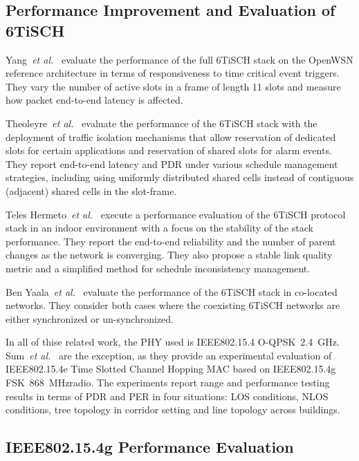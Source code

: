\documentclass[sensors,article,submit,moreauthors,pdftex]{Definitions/mdpi}
\newcommand{\fsk}           {FSK~868~MHz}
\newcommand{\oqpsk}         {O-QPSK~2.4~GHz}
\newcommand{\etal}          {\textit{et al.}}
\begin{document}
\subsection{Performance Improvement and Evaluation of 6TiSCH}
\label{sec:related_6tisch}

Yang~\etal~\cite{yang18analysis} evaluate the performance of the full 6TiSCH stack on the OpenWSN reference architecture in terms of responsiveness to time critical event triggers.
They vary the number of active slots in a frame of length 11 slots and measure how packet end-to-end latency is affected.

Theoleyre~\etal~\cite{theoleyre16experimental} evaluate the performance of the 6TiSCH stack with the deployment of traffic isolation mechanisms that allow reservation of dedicated slots for certain applications and reservation of shared slots for alarm events.
They report end-to-end latency and PDR under various schedule management strategies,
    including using uniformly distributed shared cells instead of contiguous (adjacent) shared cells in the slot-frame.

Teles Hermeto~\etal~\cite{teleshermeto18reactions} execute a performance evaluation of the 6TiSCH protocol stack in an indoor environment with a focus on the stability of the stack performance.
They report the end-to-end reliability and the number of parent changes as the network is converging.
They also propose a stable link quality metric and a simplified method for schedule inconsistency management. 

Ben Yaala~\etal~\cite{benyaala16performance} evaluate the performance of the 6TiSCH stack in co-located networks.
They consider both cases where the coexisting 6TiSCH networks are either synchronized or un-synchronized.

In all of thise related work, the PHY used is IEEE802.15.4 \oqpsk.
Sum~\etal~\cite{sum17experimental} are the exception, as they provide an experimental evaluation of IEEE802.15.4e Time Slotted Channel Hopping MAC based on IEEE802.15.4g \fsk radio.
The experiments report range and performance testing results in terms of PDR and PER in four situations:
    LOS conditions,
    NLOS conditions,
    tree topology in corridor setting and
    line topology across buildings.

\subsection{IEEE802.15.4g Performance Evaluation}
\label{sec:related_4g}
\end{document}
